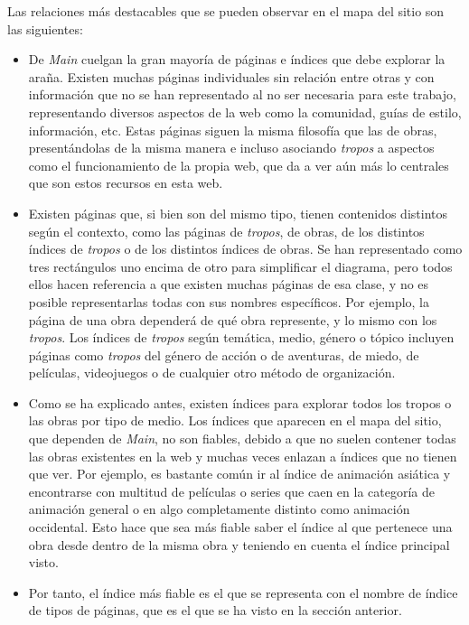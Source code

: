 Las relaciones más destacables que se pueden observar en el mapa del sitio son
las siguientes:
\begin{itemize}
  \item De \textit{Main} cuelgan la gran mayoría de páginas e índices que debe
  explorar la araña. Existen muchas páginas individuales sin relación entre
  otras y con información que no se han representado al no ser necesaria para
  este trabajo, representando diversos aspectos de la web como la comunidad,
  guías de estilo, información, etc. Estas páginas siguen la misma filosofía que
  las de obras, presentándolas de la misma manera e incluso asociando
  \textit{tropos} a aspectos como el funcionamiento de la propia web, que da a
  ver aún más lo centrales que son estos recursos en esta web.
  \item Existen páginas que, si bien son del mismo tipo, tienen contenidos
  distintos según el contexto, como las páginas de \textit{tropos}, de obras, de
  los distintos índices de \textit{tropos} o de los distintos índices de obras.
  Se han representado como tres rectángulos uno encima de otro para simplificar
  el diagrama, pero todos ellos hacen referencia a que existen muchas páginas de
  esa clase, y no es posible representarlas todas con sus nombres específicos.
  Por ejemplo, la página de una obra dependerá de qué obra represente, y lo
  mismo con los \textit{tropos}. Los índices de \textit{tropos} según temática,
  medio, género o tópico incluyen páginas como \textit{tropos} del género de
  acción o de aventuras, de miedo, de películas, videojuegos o de cualquier otro
  método de organización.
  \item Como se ha explicado antes, existen índices para explorar todos los
  tropos o las obras por tipo de medio. Los índices que aparecen en el mapa del
  sitio, que dependen de \textit{Main}, no son fiables, debido a que no suelen
  contener todas las obras existentes en la web y muchas veces enlazan a índices
  que no tienen que ver. Por ejemplo, es bastante común ir al índice de
  animación asiática y encontrarse con multitud de películas o series que caen
  en la categoría de animación general o en algo completamente distinto como
  animación occidental. Esto hace que sea más fiable saber el índice al que
  pertenece una obra desde dentro de la misma obra y teniendo en cuenta el
  índice principal visto.
  \item Por tanto, el índice más fiable es el que se representa con el nombre de
  índice de tipos de páginas, que es el que se ha visto en la sección anterior.

\end{itemize}
